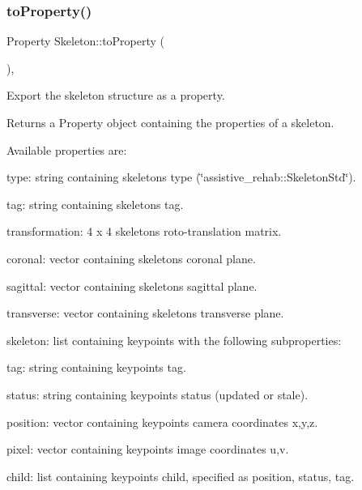 \subsubsection{\texorpdfstring{to\+Property()}{toProperty()}}
{\footnotesize\ttfamily Property Skeleton\+::to\+Property (\begin{DoxyParamCaption}{ }\end{DoxyParamCaption})\hspace{0.3cm}{\ttfamily [virtual]}, {\ttfamily [inherited]}}



Export the skeleton structure as a property. 

\begin{DoxyReturn}{Returns}
a Property object containing the properties of a skeleton.
\end{DoxyReturn}
Available properties are\+:
\begin{DoxyItemize}
\item type\+: string containing skeleton\textquotesingle{}s type (\char`\"{}assistive\+\_\+rehab\+::\+Skeleton\+Std\char`\"{}).
\item tag\+: string containing skeleton\textquotesingle{}s tag.
\item transformation\+: 4 x 4 skeleton\textquotesingle{}s roto-\/translation matrix.
\item coronal\+: vector containing skeleton\textquotesingle{}s coronal plane.
\item sagittal\+: vector containing skeleton\textquotesingle{}s sagittal plane.
\item transverse\+: vector containing skeleton\textquotesingle{}s transverse plane.
\item skeleton\+: list containing keypoints with the following subproperties\+:
\begin{DoxyItemize}
\item tag\+: string containing keypoint\textquotesingle{}s tag.
\item status\+: string containing keypoint\textquotesingle{}s status (updated or stale).
\item position\+: vector containing keypoint\textquotesingle{}s camera coordinates x,y,z.
\item pixel\+: vector containing keypoint\textquotesingle{}s image coordinates u,v.
\item child\+: list containing keypoint\textquotesingle{}s child, specified as position, status, tag. 
\end{DoxyItemize}
\end{DoxyItemize}

